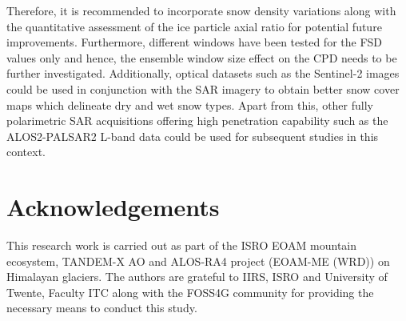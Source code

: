 \documentclass{article}
\begin{document}
Therefore, it is recommended to incorporate snow density variations along with the quantitative assessment of the ice particle axial ratio for potential future improvements. Furthermore, different windows have been tested for the FSD values only and hence, the ensemble window size effect on the CPD needs to be further investigated. Additionally, optical datasets such as the Sentinel-2 images could be used in conjunction with the SAR imagery to obtain better snow cover maps which delineate dry and wet snow types.  Apart from this, other fully polarimetric SAR acquisitions offering high penetration capability such as the ALOS2-PALSAR2 L-band data could be used for subsequent studies in this context. 

\section{Acknowledgements}
\label{sec: ack}
This research work is carried out as part of the ISRO EOAM mountain ecosystem, TANDEM-X AO and ALOS-RA4 project (EOAM-ME (WRD)) on Himalayan glaciers. The authors are grateful to IIRS, ISRO and University of Twente, Faculty ITC along with the FOSS4G community for providing the necessary means to conduct this study.  



\end{document}
